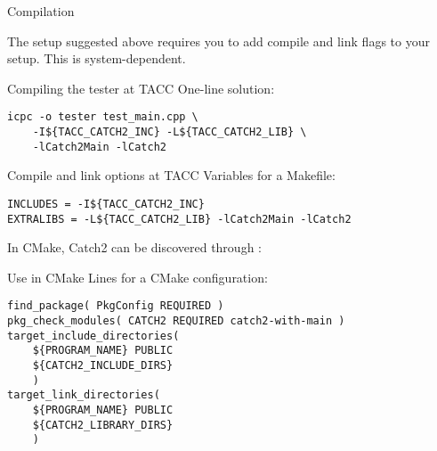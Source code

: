  {Compilation}

The setup suggested above requires you to add compile and link flags to your setup.
This is system-dependent.

\begin{tacc}
\begin{block}{Compiling the tester at TACC}
\label{sl:catch-compile}
One-line solution:
\begin{verbatim}
icpc -o tester test_main.cpp \
    -I${TACC_CATCH2_INC} -L${TACC_CATCH2_LIB} \
    -lCatch2Main -lCatch2
\end{verbatim}
\end{block}
\begin{block}{Compile and link options at TACC}
\label{sl:catch-compile-options}
Variables for a Makefile:
\begin{verbatim}
INCLUDES = -I${TACC_CATCH2_INC}
EXTRALIBS = -L${TACC_CATCH2_LIB} -lCatch2Main -lCatch2
\end{verbatim}
\end{block}
\end{tacc}

In CMake, Catch2 can be discovered through :

\begin{block}{Use in CMake}
  Lines for a CMake configuration:
\begin{verbatim}
find_package( PkgConfig REQUIRED )
pkg_check_modules( CATCH2 REQUIRED catch2-with-main )
target_include_directories(
	${PROGRAM_NAME} PUBLIC
	${CATCH2_INCLUDE_DIRS}
	)
target_link_directories(
	${PROGRAM_NAME} PUBLIC
	${CATCH2_LIBRARY_DIRS}
	)
\end{verbatim}

\end{block}

